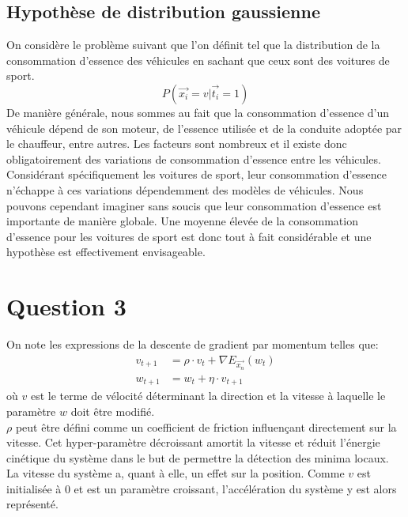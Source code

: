 \subsection{Hypothèse de distribution gaussienne}
On considère le problème suivant que l'on définit tel que la distribution de la consommation d'essence des véhicules en sachant que ceux sont des voitures de sport.
$$ P(\overrightarrow{x_i} = v | \overrightarrow{t_i} = 1) $$
De manière générale, nous sommes au fait que la consommation d'essence d'un véhicule dépend de son moteur, de l'essence utilisée et de la conduite adoptée par le chauffeur, entre autres. Les facteurs sont nombreux et il existe donc obligatoirement des variations de consommation d'essence entre les véhicules. Considérant spécifiquement les voitures de sport, leur consommation d'essence n'échappe à ces variations dépendemment des modèles de véhicules. Nous pouvons cependant imaginer sans soucis que leur consommation d'essence est importante de manière globale. Une moyenne élevée de la consommation d'essence pour les voitures de sport est donc tout à fait considérable et une hypothèse est effectivement envisageable.

\section{Question 3}
On note les expressions de la descente de gradient par momentum telles que:
\begin{equation}
\begin{split}
	v_{t+1} &= \rho \cdot v_t +  \nabla E_{\overrightarrow{x_n}} (w_t) \\
	w_{t+1} &= w_t + \eta \cdot v_{t+1}
\end{split}
\end{equation}
où $v$ est le terme de vélocité déterminant la direction et la vitesse à laquelle le paramètre $w$ doit être modifié. \\
$\rho$ peut être défini comme un coefficient de friction influençant directement sur la vitesse. Cet hyper-paramètre décroissant amortit la vitesse et réduit l'énergie cinétique du système dans le but de permettre la détection des minima locaux. \\
La vitesse du système a, quant à elle, un effet sur la position. Comme $v$ est initialisée à 0 et est un paramètre croissant, l'accélération du système y est alors représenté.
